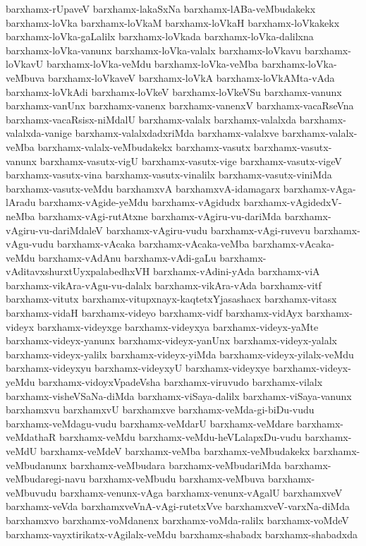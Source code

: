 {barxhamx-rUpaveV
barxhamx-lakaSxNa
barxhamx-lABa-veMbudakekx
barxhamx-loVka
barxhamx-loVkaM
barxhamx-loVkaH
barxhamx-loVkakekx
barxhamx-loVka-gaLalilx
barxhamx-loVkada
barxhamx-loVka-dalilxna
barxhamx-loVka-vanunx
barxhamx-loVka-valalx
barxhamx-loVkavu
barxhamx-loVkavU
barxhamx-loVka-veMdu
barxhamx-loVka-veMba
barxhamx-loVka-veMbuva
barxhamx-loVkaveV
barxhamx-loVkA
barxhamx-loVkAMta-vAda
barxhamx-loVkAdi
barxhamx-loVkeV
barxhamx-loVkeVSu
barxhamx-vanunx
barxhamx-vanUnx
barxhamx-vanenx
barxhamx-vanenxV
barxhamx-vacaRseVna
barxhamx-vacaRsisx-niMdalU
barxhamx-valalx
barxhamx-valalxda
barxhamx-valalxda-vanige
barxhamx-valalxdadxriMda
barxhamx-valalxve
barxhamx-valalx-veMba
barxhamx-valalx-veMbudakekx
barxhamx-vasutx
barxhamx-vasutx-vanunx
barxhamx-vasutx-vigU
barxhamx-vasutx-vige
barxhamx-vasutx-vigeV
barxhamx-vasutx-vina
barxhamx-vasutx-vinalilx
barxhamx-vasutx-viniMda
barxhamx-vasutx-veMdu
barxhamxvA
barxhamxvA-idamagarx
barxhamx-vAga-lAradu
barxhamx-vAgide-yeMdu
barxhamx-vAgidudx
barxhamx-vAgidedxV-neMba
barxhamx-vAgi-rutAtxne
barxhamx-vAgiru-vu-dariMda
barxhamx-vAgiru-vu-dariMdaleV
barxhamx-vAgiru-vudu
barxhamx-vAgi-ruvevu
barxhamx-vAgu-vudu
barxhamx-vAcaka
barxhamx-vAcaka-veMba
barxhamx-vAcaka-veMdu
barxhamx-vAdAnu
barxhamx-vAdi-gaLu
barxhamx-vAditavxshurxtUyxpalabedhxVH
barxhamx-vAdini-yAda
barxhamx-viA
barxhamx-vikAra-vAgu-vu-dalalx
barxhamx-vikAra-vAda
barxhamx-vitf
barxhamx-vitutx
barxhamx-vitupxnayx-kaqtetxYjasashacx
barxhamx-vitasx
barxhamx-vidaH
barxhamx-videyo
barxhamx-vidf
barxhamx-vidAyx
barxhamx-videyx
barxhamx-videyxge
barxhamx-videyxya
barxhamx-videyx-yaMte
barxhamx-videyx-yanunx
barxhamx-videyx-yanUnx
barxhamx-videyx-yalalx
barxhamx-videyx-yalilx
barxhamx-videyx-yiMda
barxhamx-videyx-yilalx-veMdu
barxhamx-videyxyu
barxhamx-videyxyU
barxhamx-videyxye
barxhamx-videyx-yeMdu
barxhamx-vidoyxVpadeVsha
barxhamx-viruvudo
barxhamx-vilalx
barxhamx-visheVSaNa-diMda
barxhamx-viSaya-dalilx
barxhamx-viSaya-vanunx
barxhamxvu
barxhamxvU
barxhamxve
barxhamx-veMda-gi-biDu-vudu
barxhamx-veMdagu-vudu
barxhamx-veMdarU
barxhamx-veMdare
barxhamx-veMdathaR
barxhamx-veMdu
barxhamx-veMdu-heVLalapxDu-vudu
barxhamx-veMdU
barxhamx-veMdeV
barxhamx-veMba
barxhamx-veMbudakekx
barxhamx-veMbudanunx
barxhamx-veMbudara
barxhamx-veMbudariMda
barxhamx-veMbudaregi-navu
barxhamx-veMbudu
barxhamx-veMbuva
barxhamx-veMbuvudu
barxhamx-venunx-vAga
barxhamx-venunx-vAgalU
barxhamxveV
barxhamx-veVda
barxhamxveVnA-vAgi-rutetxVve
barxhamxveV-varxNa-diMda
barxhamxvo
barxhamx-voMdanenx
barxhamx-voMda-ralilx
barxhamx-voMdeV
barxhamx-vayxtirikatx-vAgilalx-veMdu
barxhamx-shabadx
barxhamx-shabadxda
}
